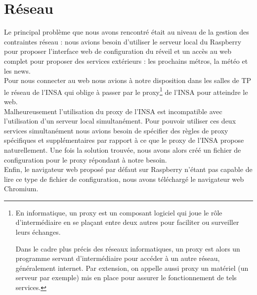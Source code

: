 \section{Réseau}
	Le principal problème que nous avons rencontré était au niveau de la gestion des contraintes réseau : nous avions besoin d'utiliser le serveur local du Raspberry pour proposer l'interface web de configuration du réveil et un accès au web complet pour proposer des services extérieurs : les prochains métros, la météo et les news.\\

	Pour nous connecter au web nous avions à notre disposition dans les salles de TP le réseau de l'INSA qui oblige à passer par le proxy\footnote{En informatique, un proxy est un composant logiciel qui joue le rôle d'intermédiaire en se plaçant entre deux autres pour faciliter ou surveiller leurs échanges.

	Dans le cadre plus précis des réseaux informatiques, un proxy est alors un programme servant d'intermédiaire pour accéder à un autre réseau, généralement internet. Par extension, on appelle aussi proxy un matériel (un serveur par exemple) mis en place pour assurer le fonctionnement de tels services.} de l'INSA pour atteindre le web.\\

	Malheureusement l'utilisation du proxy de l'INSA est incompatible avec l'utilisation d'un serveur local simultanément. Pour pouvoir utiliser ces deux services simultanément nous avions besoin de spécifier des règles de proxy spécifiques et supplémentaires par rapport à ce que le proxy de l'INSA propose naturellement. Une fois la solution trouvée, nous avons alors créé un fichier de configuration pour le proxy répondant à notre besoin.\\

	Enfin, le navigateur web proposé par défaut sur Raspberry n'étant pas capable de lire ce type de fichier de configuration, nous avons téléchargé le navigateur web Chromium.